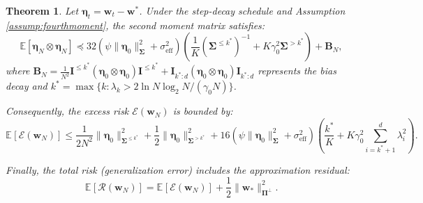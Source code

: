 \documentclass{article}
\theoremstyle{definition}
\theoremstyle{definition}
\theoremstyle{plain}
\newtheorem{theorem}{Theorem}
\theoremstyle{plain}
\theoremstyle{plain}
\theoremstyle{plain}
\theoremstyle{plain}
\newcommand{\bs}[1]{\boldsymbol{\mathbf{#1}}}
\newcommand{\Ex}{\mathbb{E}}
\newcommand{\eff}{\mathrm{eff}}
\newcommand{\Sig}{\mathbf{\Sigma}}
\newcommand{\id}{\mathbf{I}}
\newcommand{\ex}[2][]{\mathbb{E}_{#1}\left[ #2 \right]}
\begin{document}
\begin{theorem}\label{instanceuppergeneral}
    Let $\bs \eta_t = \bs w_t - \bs w^*$. Under the step-decay schedule and Assumption \ref{assump:fourthmoment}, the second moment matrix satisfies:
    \begin{equation}
        \Ex[\bs\eta_N\otimes\bs \eta_N]\preceq 32 \left(\psi\|\bs\eta_0\|^2_{\bs\Sigma}+\sigma_\eff^2\right)\left( \frac{1}{K}(\bs\Sigma^{\leq k^*})^{-1} +K\gamma_0^2 \bs\Sigma^{>k^*} \right) + \bs B_N,
    \end{equation}
    where $\bs B_N = \frac{1}{N^2}\id^{\leq k^*}(\bs\eta_0\otimes\bs \eta_0)\id^{\leq k^*}+\id_{k^*:d}(\bs\eta_0\otimes\bs \eta_0)\id_{k^*:d}$ represents the bias decay and $k^* = \max\{k:\lambda_{k}> 2\ln N\log_2 N/ (\gamma_0 N) \}$.
    
    Consequently, the excess risk $\mathcal{E}(\bs w_N)$ is bounded by:
    \begin{equation}
        \ex{\mathcal{E}(\bs w_{N})}\leq\frac{1}{2N^2}\|\bs\eta_0\|^2_{\Sig^{\leq k^*}} + \frac{1}{2}\|\bs\eta_0\|^2_{\Sig^{>k^*}} + 16\left(\psi\|\bs\eta_0\|^2_{\bs\Sigma}+\sigma_\eff^2\right)\left( \frac{k^*}{K} + K\gamma_0^2 \sum_{i = k^*+1}^{d} \lambda_{i}^2 \right).
    \end{equation}
    
    Finally, the total risk (generalization error) includes the approximation residual:
    \begin{equation}
        \ex{\mathcal{R}(\bs w_{N})} = \ex{\mathcal{E}(\bs w_{N})} +\frac{1}{2}\|\bs w_*\|_{\bs \Pi^{\perp}}^2.
    \end{equation}
\end{theorem}
\end{document}
